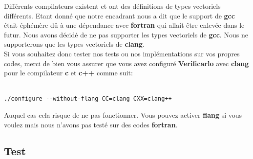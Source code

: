 \documentclass[11pt]{article}
\begin{document}
Différents compilateurs existent et ont des définitions de types vectoriels
différents. Etant donné que notre encadrant nous a dit que le support de \textbf{gcc}
était éphémère dû à une dépendance avec \textbf{fortran} qui allait être enlevée
dans le futur. Nous avons décidé de ne pas supporter les types vectoriels
de \textbf{gcc}. Nous ne supporterons que les types vectoriels de \textbf{clang}.
\\ \vspace{5mm}
Si vous souhaitez donc tester nos tests ou nos implémentations sur vos propres
codes, merci de bien vous assurer que vous avez configuré \textbf{Verificarlo} avec
\textbf{clang} pour le compilateur \textbf{c} et \textbf{c++} comme suit:

\begin{verbatim}

./configure --without-flang CC=clang CXX=clang++

\end{verbatim}

Auquel cas cela risque de ne pas fonctionner. Vous pouvez activer \textbf{flang} si
vous voulez mais nous n'avons pas testé sur des codes \textbf{fortran}.

\subsection{Test}
\label{sec:orgee5d736}
\end{document}
